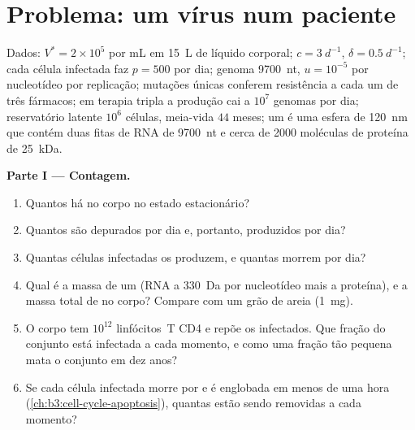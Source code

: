 \section{Problema: um vírus num paciente}

\begin{problem}
\label{pb:b3:virology:1}
Dados:  $V^{*} = 2\times 10^{5}$ por mL em \qty{15}{L} de
líquido corporal; $c = \qty{3}{d^{-1}}$, $\delta = \qty{0.5}{d^{-1}}$;
cada célula infectada faz $p = 500$  por dia; genoma
\qty{9700}{nt}, $u = 10^{-5}$ por nucleotídeo por replicação; mutações
únicas conferem resistência a cada um de três fármacos; em terapia
tripla a produção cai a $10^{7}$ genomas por dia; reservatório latente
$10^{6}$ células, meia-vida $44$ meses; um  é uma esfera de
\qty{120}{nm} que contém duas fitas de RNA de \qty{9700}{nt} e cerca de
\num{2000} moléculas de proteína de \qty{25}{kDa}.

\medskip
\noindent\textbf{Parte I --- Contagem.}
\begin{enumerate}
  \item Quantos  há no corpo no estado estacionário?
  \item Quantos são depurados por dia e, portanto, produzidos por dia?
  \item Quantas células infectadas os produzem, e quantas morrem por
        dia?
  \item Qual é a massa de um  (RNA a \qty{330}{Da} por
        nucleotídeo mais a proteína), e a massa total de  no
        corpo? Compare com um grão de areia (\qty{1}{mg}).
  \item O corpo tem $10^{12}$ linfócitos~T CD4 e repõe os infectados.
        Que fração do conjunto está infectada a cada momento, e como
        uma fração tão pequena mata o conjunto em dez anos?
  \item Se cada célula infectada morre por  e é englobada em
        menos de uma hora (\cref{ch:b3:cell-cycle-apoptosis}), quantas
        estão sendo removidas a cada momento?
\end{enumerate}


\end{problem}
